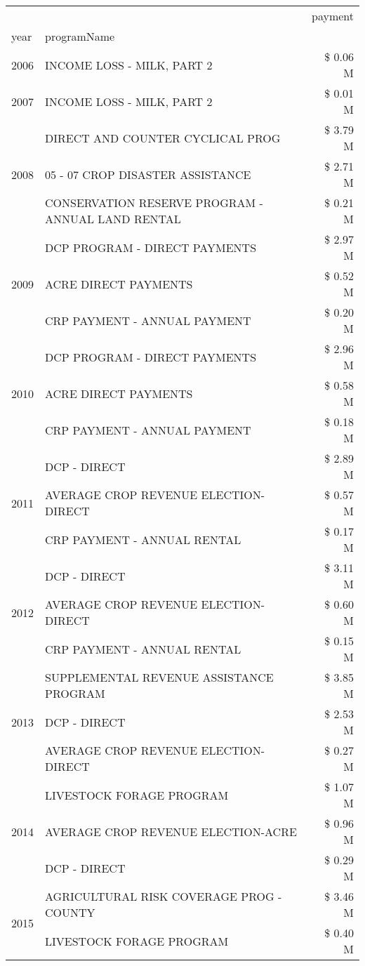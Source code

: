 \begin{tabular}{llr}
\toprule
 &  & payment \\
year & programName &  \\
\midrule
2006 & INCOME LOSS - MILK, PART 2 & \$ 0.06 M \\
\cline{1-3}
2007 & INCOME LOSS - MILK, PART 2 & \$ 0.01 M \\
\cline{1-3}
\multirow[t]{3}{*}{2008} & DIRECT AND COUNTER CYCLICAL PROG & \$ 3.79 M \\
 & 05 - 07 CROP DISASTER ASSISTANCE & \$ 2.71 M \\
 & CONSERVATION RESERVE PROGRAM - ANNUAL LAND RENTAL & \$ 0.21 M \\
\cline{1-3}
\multirow[t]{3}{*}{2009} & DCP PROGRAM - DIRECT PAYMENTS & \$ 2.97 M \\
 & ACRE DIRECT PAYMENTS & \$ 0.52 M \\
 & CRP PAYMENT - ANNUAL PAYMENT & \$ 0.20 M \\
\cline{1-3}
\multirow[t]{3}{*}{2010} & DCP PROGRAM - DIRECT PAYMENTS & \$ 2.96 M \\
 & ACRE DIRECT PAYMENTS & \$ 0.58 M \\
 & CRP PAYMENT - ANNUAL PAYMENT & \$ 0.18 M \\
\cline{1-3}
\multirow[t]{3}{*}{2011} & DCP - DIRECT & \$ 2.89 M \\
 & AVERAGE CROP REVENUE ELECTION-DIRECT & \$ 0.57 M \\
 & CRP PAYMENT - ANNUAL RENTAL & \$ 0.17 M \\
\cline{1-3}
\multirow[t]{3}{*}{2012} & DCP - DIRECT & \$ 3.11 M \\
 & AVERAGE CROP REVENUE ELECTION-DIRECT & \$ 0.60 M \\
 & CRP PAYMENT - ANNUAL RENTAL & \$ 0.15 M \\
\cline{1-3}
\multirow[t]{3}{*}{2013} & SUPPLEMENTAL REVENUE ASSISTANCE PROGRAM & \$ 3.85 M \\
 & DCP - DIRECT & \$ 2.53 M \\
 & AVERAGE CROP REVENUE ELECTION-DIRECT & \$ 0.27 M \\
\cline{1-3}
\multirow[t]{3}{*}{2014} & LIVESTOCK FORAGE PROGRAM & \$ 1.07 M \\
 & AVERAGE CROP REVENUE ELECTION-ACRE & \$ 0.96 M \\
 & DCP - DIRECT & \$ 0.29 M \\
\cline{1-3}
\multirow[t]{3}{*}{2015} & AGRICULTURAL RISK COVERAGE PROG - COUNTY & \$ 3.46 M \\
 & LIVESTOCK FORAGE PROGRAM & \$ 0.40 M \\

\end{tabular}
